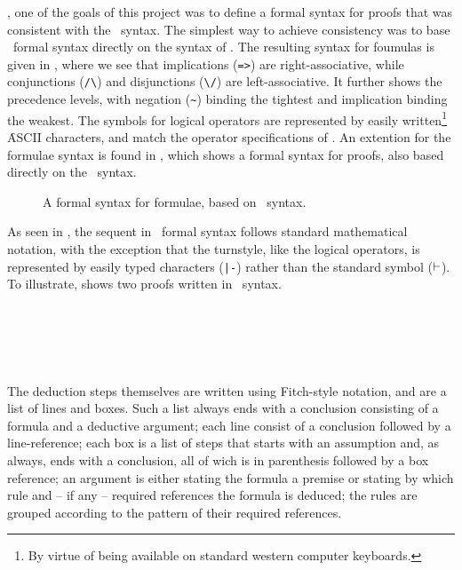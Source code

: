 \documentclass[BA.tex]{subfiles}
\begin{document}
, one of the goals of this project
 was to define a formal syntax for proofs that was consistent with the
 \bp\ syntax\cite{boxhelp}. The simplest way to achieve consistency
 was to base \our\ formal syntax directly on the syntax of \bp.
 The resulting syntax for foumulas is given in , where we see
 that implications (\verb+=>+) are right-associative, while conjunctions 
 (\verb+/\+) and disjunctions (\verb+\/+) are left-associative. It further
 shows the precedence levels, with negation (\verb+~+) binding the tightest
 and implication binding the weakest. The symbols for logical operators are
 represented by easily written\footnote{By virtue of being available on 
 standard western computer keyboards.} \f{ASCII} characters, and match the
 operator specifications of \bp.
 An extention for the formulae syntax is found in , 
 which shows a formal
 syntax for proofs, also based directly on the \bp\ syntax.

\begin{figure}[t]

\caption[A {\bf formal} syntax for formulae]
{A formal syntax for formulae, based on \bp\ syntax.}
\label{fform}
\end{figure}

 As seen in , the sequent in \our\ formal syntax
 follows standard mathematical notation, with the exception that the
 turnstyle, like the  logical operators, is represented by
 easily typed characters (\verb+|-+) rather than the standard symbol 
 (\(\vdash\)). To illustrate,  shows two proofs
 written in \bp\ syntax.

\begin{figure}[!h]
\centering
\begin{subfigure}[t]{0.45\textwidth}
\scriptsize

~\\~\\~\\
\label{sf:exr}
\end{subfigure}
\(\quad\)
\begin{subfigure}[t]{0.45\textwidth}
\scriptsize

\label{sf:exq}
\end{subfigure}
\caption[]{}
\label{bpex}
\end{figure}
 
 The deduction steps themselves are written using 
 Fitch-style notation\cite{boxhelp},
 and are a list of lines and boxes. Such a list always ends with a 
 conclusion consisting of a formula
 and a deductive argument; each line consist of a conclusion followed 
 by a line-reference; each box is a list of steps that starts with an 
 assumption and, as always, ends with a conclusion, all of wich is in
 parenthesis followed by a box reference; an argument is either stating
 the formula a premise or stating by which rule and -- if any -- required 
 references the formula is deduced; the rules are grouped according to the
 pattern of their required references. 
 
\end{document}

